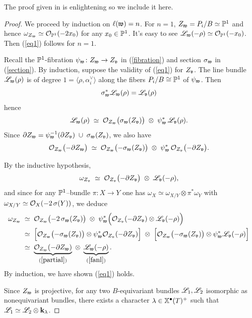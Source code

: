 \documentclass[12pt]{article}
\begin{document}
The proof given in \cite{Brion2004} is enlightening so we include it here.
\begin{proof}
    We proceed by induction on $\ell(\mathfrak{w}) = n$. For $n = 1$, $Z_{\mathfrak{w}} = P_i/B \simeq \mathbb{P}^1$ and hence $\omega_{Z_{\mathfrak{w}}} \simeq \mathcal{O}_{\mathbb{P}^1}(-2x_0)$ for any $x_0 \in \mathbb{P}^1$. It's easy to see $\mathscr{L}_{\mathfrak{w}}(-\rho) \simeq \mathcal{O}_{\mathbb{P}^1}(-x_0)$. Then (\ref{eq1}) follows for $n = 1$.

    Recall the $\mathbb{P}^1$-fibration $\psi_{\mathfrak{w}} \colon Z_{\mathfrak{w}} \to Z_{\mathfrak{v}}$ in (\ref{fibration}) and section $\sigma_{\mathfrak{w}}$ in (\ref{section}). By induction, suppose the validity of (\ref{eq1}) for $Z_{\mathfrak{v}}$. The line bundle $\mathscr{L}_{\mathfrak{w}}(\rho)$ is of degree $1 = \langle \rho, \alpha^\vee_i \rangle$ along the fibers $P_i/B \cong \mathbb{P}^1$ of $\psi_{\mathfrak{w}}$. Then 
    \[\sigma_{\mathfrak{w}}^* \mathscr{L}_{\mathfrak{w}}(\rho) = \mathscr{L}_{\mathfrak{v}}(\rho)\]
hence
\begin{equation}\label{fanl}
\mathscr{L}_{\mathfrak{w}}(\rho)
\;\simeq\;
\mathcal{O}_{Z_{\mathfrak{w}}}\bigl(\sigma_{\mathfrak{w}}(Z_{\mathfrak{v}})\bigr)
\;\otimes\;
\psi_{\mathfrak{w}}^*\,\mathscr{L}_{\mathfrak{v}}(\rho).
\end{equation}
Since 
\(\partial Z_{\mathfrak{w}}
=\psi_{\mathfrak{w}}^{-1}(\partial Z_{\mathfrak{v}})\;\cup\;\sigma_{\mathfrak{w}}(Z_{\mathfrak{v}})\),
we also have
\begin{equation}\label{partial}
\mathcal{O}_{Z_{\mathfrak{w}}}\bigl(-\partial Z_{\mathfrak{w}}\bigr)
\;\simeq\;
\mathcal{O}_{Z_{\mathfrak{w}}}\bigl(-\sigma_{\mathfrak{w}}(Z_{\mathfrak{v}})\bigr)
\;\otimes\;
\psi_{\mathfrak{w}}^*\,\mathcal{O}_{Z_{\mathfrak{v}}}\bigl(-\partial Z_{\mathfrak{v}}\bigr).
\end{equation}

\smallskip

\noindent
By the inductive hypothesis,
\[
\omega_{Z_{\mathfrak{v}}}
\;\simeq\;
\mathcal{O}_{Z_{\mathfrak{v}}}\bigl(-\partial Z_{\mathfrak{v}}\bigr)
\;\otimes\;
\mathscr{L}_{\mathfrak{v}}(-\rho),
\]
and since for any \(\mathbb{P}^1\)–bundle \(\pi\colon X\to Y\) one has
\(\omega_{X}\simeq\omega_{X/Y}\otimes\pi^*\omega_Y\) with
\(\omega_{X/Y}\simeq\mathcal{O}_X(-2\,\sigma(Y))\),
we deduce
\[
\begin{aligned}
\omega_{Z_{\mathfrak{w}}}
&\;\simeq\;
\mathcal{O}_{Z_{\mathfrak{w}}}\bigl(-2\,\sigma_{\mathfrak{w}}(Z_{\mathfrak{v}})\bigr)
\;\otimes\;
\psi_{\mathfrak{w}}^*
\Bigl(
\mathcal{O}_{Z_{\mathfrak{v}}}(-\partial Z_{\mathfrak{v}})
\otimes
\mathscr{L}_{\mathfrak{v}}(-\rho)
\Bigr)
\\
&\;\simeq\;
\Bigl[
\mathcal{O}_{Z_{\mathfrak{w}}}\bigl(-\sigma_{\mathfrak{w}}(Z_{\mathfrak{v}})\bigr)
\otimes
\psi_{\mathfrak{w}}^*\mathcal{O}_{Z_{\mathfrak{v}}}(-\partial Z_{\mathfrak{v}})
\Bigr]
\;\otimes\;
\Bigl[
\mathcal{O}_{Z_{\mathfrak{w}}}\bigl(-\sigma_{\mathfrak{w}}(Z_{\mathfrak{v}})\bigr)
\otimes
\psi_{\mathfrak{w}}^*\mathscr{L}_{\mathfrak{v}}(-\rho)
\Bigr]
\\
&\;\simeq\;
\underbrace{\mathcal{O}_{Z_{\mathfrak{w}}}(-\partial Z_{\mathfrak{w}})}_{(\ref{partial})}
\;\otimes\;
\underbrace{\mathscr{L}_{\mathfrak{w}}(-\rho)}_{(\ref{fanl})}.
\end{aligned}
\]
By induction, we have shown (\ref{eq1}) holds.

Since $Z_{\mathfrak{w}}$ is projective, for any two $B$-equivariant bundles $\mathscr{L}_1, \mathscr{L}_2$ isomorphic as nonequivariant bundles, there exists a character $\lambda \in \mathbb{X}^{\bullet}(T)^+$ such that $\mathscr{L}_1 \simeq \mathscr{L}_2 \otimes \mathbf{k}_{\lambda}$.
\end{proof}
\end{document}
